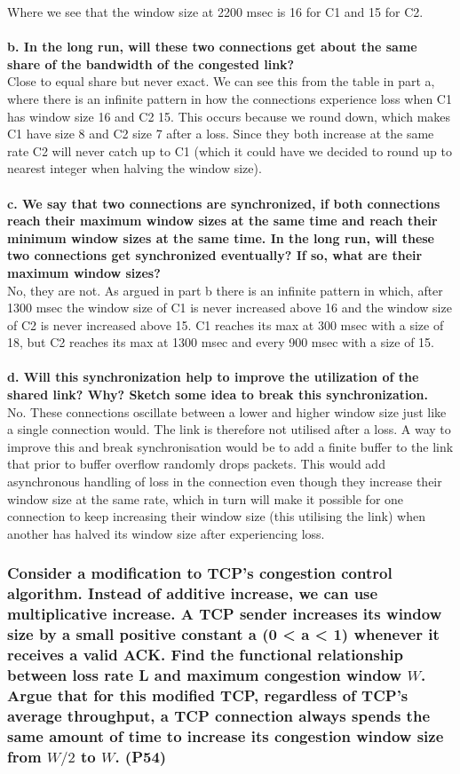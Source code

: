 Where we see that the window size at 2200 msec is 16 for C1 and 15 for C2. \\
\\
\textbf{b. In the long run, will these two connections get about the same share of the bandwidth of the congested link?} \\
Close to equal share but never exact. We can see this from the table in part a, where there is an infinite pattern in how the connections experience loss when C1 has window size 16 and C2 15. This occurs because we round down, which makes C1 have size 8 and C2 size 7 after a loss. Since they both increase at the same rate C2 will never catch up to C1 (which it could have we decided to round up to nearest integer when halving the window size). \\
\\
\textbf{c. We say that two connections are synchronized, if both connections reach their maximum window sizes at the same time and reach their minimum window sizes at the same time. In the long run, will these two connections get synchronized eventually? If so, what are their maximum window sizes?} \\
No, they are not. As argued in part b there is an infinite pattern in which, after 1300 msec the window size of C1 is never increased above 16 and the window size of C2 is never increased above 15. C1 reaches its max at 300 msec with a size of 18, but C2 reaches its max at 1300 msec and every 900 msec with a size of 15.\\
\\
\textbf{d. Will this synchronization help to improve the utilization of the shared link? Why? Sketch some idea to break this synchronization.} \\
No. These connections oscillate between a lower and higher window size just like a single connection would. The link is therefore not utilised after a loss. A way to improve this and break synchronisation would be to add a finite buffer to the link that prior to buffer overflow randomly drops packets. This would add asynchronous handling of loss in the connection even though they increase their window size at the same rate, which in turn will make it possible for one connection to keep increasing their window size (this utilising the link) when another has halved its window size after experiencing loss.


\subsubsection{Consider a modification to TCP's congestion control algorithm. Instead of additive increase, we can use multiplicative increase. A TCP sender increases its window size by a small positive constant a (0 < a < 1) whenever it receives a valid ACK. Find the functional relationship between loss rate L and maximum congestion window $W$. Argue that for this modified TCP, regardless of TCP's average throughput, a TCP connection always spends the same amount of time to increase its congestion window size from $W/2$ to $W$. (P54)}


